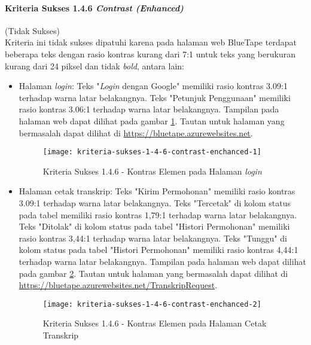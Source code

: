 \paragraph{Kriteria Sukses 1.4.6 \textit{Contrast (Enhanced)}}
\label{par:kepatuhan_bluetape_kriteria_sukses_1.4.6}
(Tidak Sukses)\\

Kriteria ini tidak sukses dipatuhi karena pada halaman web BlueTape terdapat beberapa teks dengan rasio kontras kurang dari 7:1 untuk teks yang berukuran kurang dari 24 piksel dan tidak \textit{bold}, antara lain:

\begin{itemize}
    \item Halaman \textit{login}: Teks "\textit{Login} dengan Google" memiliki rasio kontras 3.09:1 terhadap warna latar belakangnya. Teks "Petunjuk Penggunaan" memiliki rasio kontras 3.06:1 terhadap warna latar belakangnya. Tampilan pada halaman web dapat dilihat pada gambar \ref{fig:1.4.6_contrast_enchanced_1}. Tautan untuk halaman yang bermasalah dapat dilihat di \url{https://bluetape.azurewebsites.net}.
    \begin{figure}[H]
        \centering  
        \texttt{[image: kriteria-sukses-1-4-6-contrast-enchanced-1]}  
        \caption[Kriteria Sukses 1.4.6 - Kontras Elemen pada Halaman \textit{login}]{Kriteria Sukses 1.4.6 - Kontras Elemen pada Halaman \textit{login}}
        \label{fig:1.4.6_contrast_enchanced_1}  
    \end{figure} 

    \item Halaman cetak transkrip: Teks "Kirim Permohonan" memiliki rasio kontras 3.09:1 terhadap warna latar belakangnya. Teks "Tercetak" di kolom status pada tabel memiliki rasio kontras 1,79:1 terhadap warna latar belakangnya. Teks "Ditolak" di kolom status pada tabel "Histori Permohonan" memiliki rasio kontras 3,44:1 terhadap warna latar belakangnya. Teks "Tunggu" di kolom status pada tabel "Histori Permohonan" memiliki rasio kontras 4,44:1 terhadap warna latar belakangnya. Tampilan pada halaman web dapat dilihat pada gambar \ref{fig:1.4.6_contrast_enchanced_2}. Tautan untuk halaman yang bermasalah dapat dilihat di \url{https://bluetape.azurewebsites.net/TranskripRequest}.
    \begin{figure}[H]
        \centering  
        \texttt{[image: kriteria-sukses-1-4-6-contrast-enchanced-2]}  
        \caption[Kriteria Sukses 1.4.6 - Kontras Elemen pada Halaman Cetak Transkrip]{Kriteria Sukses 1.4.6 - Kontras Elemen pada Halaman Cetak Transkrip}
        \label{fig:1.4.6_contrast_enchanced_2}  
    \end{figure} 
    

\end{itemize}
